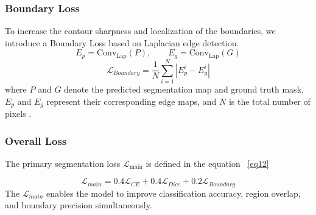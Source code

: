 \documentclass[pdflatex,sn-mathphys-num]{sn-jnl}
\begin{document}
\subsubsection{Boundary Loss}
To increase the contour sharpness and localization of the boundaries, we introduce a Boundary Loss based on Laplacian edge detection. 
\begin{equation}
E_{p} = \text{Conv}_{\text{Lap}}(P), \qquad
E_{g} = \text{Conv}_{\text{Lap}}(G)
\end{equation}
\begin{equation}
\mathcal{L}_{Boundary} = \frac{1}{N} \sum_{i=1}^{N} \left| E_{p}^{i} - E_{g}^{i} \right|
\label{eq:boundary_loss}
\end{equation}
where $P$ and $G$ denote the predicted segmentation map and ground truth mask, $E_p$ and $E_g$ represent their corresponding edge maps, and $N$ is the total number of pixels \cite{kervadec2019boundary}.
\subsubsection{Overall Loss}

The primary segmentation loss $\mathcal{L}_{\text{main}}$ is defined in the equation ~\ref{eq12}

\begin{equation}
\mathcal{L}_{main} =
0.4\mathcal{L}_{CE}
+
0.4\mathcal{L}_{Dice}
+
0.2\mathcal{L}_{Boundary}\label{eq12}
\end{equation}
The $\mathcal{L}_{main}$ enables the model to improve classification accuracy, region overlap, and boundary precision simultaneously.
\end{document}
